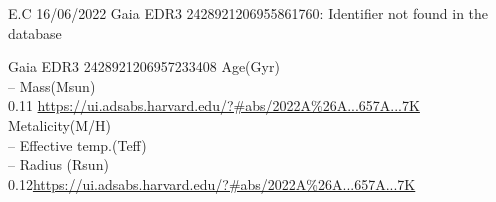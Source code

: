 E.C 16/06/2022
Gaia EDR3 2428921206955861760: Identifier not found in the database 

Gaia EDR3 2428921206957233408
Age(Gyr)\\
--
Mass(Msun)\\
0.11 \url{https://ui.adsabs.harvard.edu/?#abs/2022A%26A...657A...7K}\\
Metalicity(M/H)\\
--
Effective temp.(Teff)\\
--
Radius (Rsun)\\
0.12\url{https://ui.adsabs.harvard.edu/?#abs/2022A%26A...657A...7K}\\